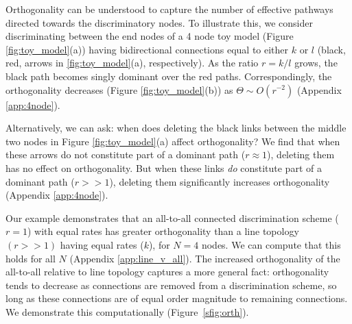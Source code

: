 Orthogonality can be understood to capture the number of effective pathways directed towards the discriminatory nodes.  To illustrate this, we consider discriminating between the end nodes of a 4 node toy model (Figure \ref{fig:toy_model}(a)) having bidirectional connections equal to either $k$ or $l$ (black, red, arrows in \ref{fig:toy_model}(a), respectively).  As the ratio $r=k/l$ grows, the black path becomes singly dominant over the red paths.  Correspondingly, the orthogonality decreases (Figure \ref{fig:toy_model}(b)) as $\Theta \sim O(r^{-2})$ (Appendix \ref{app:4node}).

Alternatively, we can ask: when does deleting the black links between the middle two nodes in Figure \ref{fig:toy_model}(a) affect orthogonality?  We find that when these arrows do not constitute part of a dominant path ($r\approx1$), deleting them has no effect on orthogonality.  But when these links {\it do} constitute part of a dominant path ($r>>1$), deleting them significantly increases orthogonality (Appendix \ref{app:4node}).



Our example demonstrates that an all-to-all connected discrimination scheme ($r=1$) with equal rates has greater orthogonality than a line topology $(r>>1)$ having equal rates ($k$), for $N=4$ nodes.  We can compute that this holds for all $N$ (Appendix \ref{app:line_v_all}).  The increased orthogonality of the all-to-all relative to line topology captures a more general fact: orthogonality tends to decrease as connections are removed from a discrimination scheme, so long as these connections are of equal order magnitude to remaining connections.  We demonstrate this computationally (Figure~\ref{sfig:orth}). 
